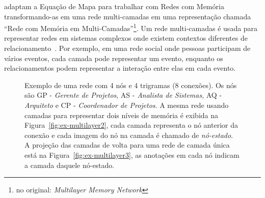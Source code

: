 \documentclass[12pt,a4paper]{article}
\begin{document}
 adaptam a Equação de Mapa  para trabalhar com  Redes com Memória transformando-as em uma rede multi-camadas em uma representação chamada \enquote{Rede com Memória em Multi-Camadas}\footnote{no original: \textit{Multilayer Memory Network}}. Um rede multi-camadas é usada para representar redes em sistemas complexos onde existem contextos diferentes de relacionamento~\cite{Kivela2014-pb}. Por exemplo, em uma rede social onde pessoas participam de vários eventos, cada camada pode representar um evento, enquanto os relacionamentos podem representar a interação entre elas em cada evento. 

\begin{figure}[htb]
    \centering
    \caption{Exemplo de uma rede com 4 nós e 4 trigramas (8 conexões). Os nós são GP - \textit{Gerente de Projetos}, AS - \textit{Analista de Sistemas}, AQ - \textit{Arquiteto} e CP - \textit{Coordenador de Projetos}. A mesma rede usando camadas para representar dois níveis de memória é exibida na Figura~\ref{fig:ex-multilayer2}, cada camada representa o nó anterior da conexão e cada imagem do nó na camada é chamado de \textit{nó-estado}. A projeção das camadas de volta para uma rede de camada única está na Figura~\ref{fig:ex-multilayer3}, as anotações em cada nó indicam a camada daquele nó-estado.}
    \label{fig:ex-multilayer-camadas}
\end{figure}
\end{document}
